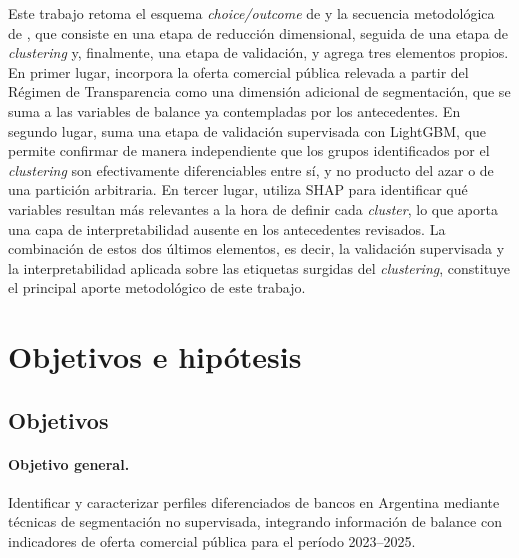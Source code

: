 \documentclass[11pt,a4paper]{article}
\begin{document}
Este trabajo retoma el esquema \textit{choice/outcome} de \citet{roengpitya2014} y la secuencia metodológica de \citet{mercadier2025}, que consiste en una etapa de reducción dimensional, seguida de una etapa de \textit{clustering} y, finalmente, una etapa de validación, y agrega tres elementos propios. En primer lugar, incorpora la oferta comercial pública relevada a partir del Régimen de Transparencia como una dimensión adicional de segmentación, que se suma a las variables de balance ya contempladas por los antecedentes. En segundo lugar, suma una etapa de validación supervisada con LightGBM, que permite confirmar de manera independiente que los grupos identificados por el \textit{clustering} son efectivamente diferenciables entre sí, y no producto del azar o de una partición arbitraria. En tercer lugar, utiliza SHAP para identificar qué variables resultan más relevantes a la hora de definir cada \textit{cluster}, lo que aporta una capa de interpretabilidad ausente en los antecedentes revisados. La combinación de estos dos últimos elementos, es decir, la validación supervisada y la interpretabilidad aplicada sobre las etiquetas surgidas del \textit{clustering}, constituye el principal aporte metodológico de este trabajo.

\section{Objetivos e hipótesis}
\label{sec:objetivos}

\subsection{Objetivos}

\paragraph{Objetivo general.} Identificar y caracterizar perfiles diferenciados de bancos en Argentina
mediante técnicas de segmentación no supervisada, integrando información de balance con indicadores de
oferta comercial pública para el período 2023--2025.
\end{document}
